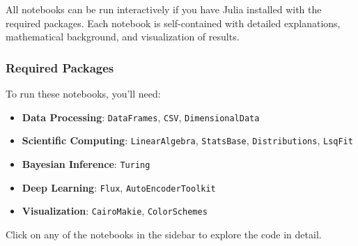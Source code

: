 \documentclass[
]{scrartcl}
\providecommand{\tightlist}{%
  \setlength{\itemsep}{0pt}\setlength{\parskip}{0pt}}\usepackage{longtable,booktabs,array}
\begin{document}
All notebooks can be run interactively if you have Julia installed with
the required packages. Each notebook is self-contained with detailed
explanations, mathematical background, and visualization of results.

\subsubsection{Required Packages}\label{required-packages}

To run these notebooks, you'll need:

\begin{itemize}
\tightlist
\item
  \textbf{Data Processing}: \texttt{DataFrames}, \texttt{CSV},
  \texttt{DimensionalData}
\item
  \textbf{Scientific Computing}: \texttt{LinearAlgebra},
  \texttt{StatsBase}, \texttt{Distributions}, \texttt{LsqFit}
\item
  \textbf{Bayesian Inference}: \texttt{Turing}
\item
  \textbf{Deep Learning}: \texttt{Flux}, \texttt{AutoEncoderToolkit}
\item
  \textbf{Visualization}: \texttt{CairoMakie}, \texttt{ColorSchemes}
\end{itemize}

Click on any of the notebooks in the sidebar to explore the code in
detail.
\end{document}
